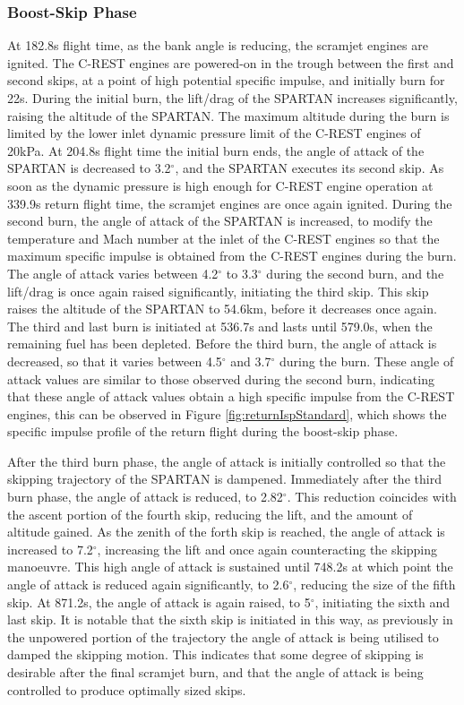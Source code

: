 \subsubsection{ Boost-Skip Phase}
At 182.8s flight time, as the bank angle is reducing, the scramjet engines are ignited. The C-REST engines are powered-on in the trough between the first and second skips, at a point of high potential specific impulse, and initially burn for 22s. During the initial burn, the lift/drag of the SPARTAN increases significantly, raising the altitude of the SPARTAN. The maximum altitude during the burn is limited by the lower inlet dynamic pressure limit of the C-REST engines of 20kPa. 
At 204.8s flight time the initial burn ends, the angle of attack of the SPARTAN is decreased to 3.2$^\circ$, and the SPARTAN executes its second skip. As soon as the dynamic pressure is high enough for C-REST engine operation at 339.9s return flight time, the scramjet engines are once again ignited.
During the second burn, the angle of attack of the SPARTAN is increased, to modify the temperature and Mach number at the inlet of the C-REST engines so that the maximum specific impulse is obtained from the C-REST engines during the burn. 
The angle of attack varies between 4.2$^\circ$ to 3.3$^\circ$ during the second burn, and the lift/drag is once again raised significantly, initiating the third skip. 
This skip raises the altitude of the SPARTAN to 54.6km, before it decreases once again. 
The third and last burn is initiated at 536.7s and lasts until 579.0s, when the remaining fuel has been depleted. Before the third burn, the angle of attack is decreased, so that it varies between 4.5$^\circ$ and 3.7$^\circ$ during the burn. These angle of attack values are similar to those observed during the second burn, indicating that these angle of attack values obtain a high specific impulse from the C-REST engines, this can be observed in Figure \ref{fig:returnIspStandard}, which shows the specific impulse profile of the return flight during the boost-skip phase. 

After the third burn phase, the angle of attack is initially controlled so that the skipping trajectory of the SPARTAN is dampened.
Immediately after the third burn phase, the angle of attack is reduced, to 2.82$^\circ$. This reduction coincides with the ascent portion of the fourth skip, reducing the lift, and the amount of altitude gained. 
As the zenith of the forth skip is reached, the angle of attack is increased to 7.2$^\circ$, increasing the lift and once again counteracting the skipping manoeuvre. 
This high angle of attack is sustained until 748.2s at which point the angle of attack is reduced again significantly, to 2.6$^\circ$, reducing the size of the fifth skip. At 871.2s, the angle of attack is again raised, to 5$^\circ$, initiating the sixth and last skip.
It is notable that the sixth skip is initiated in this way, as previously in the unpowered portion of the trajectory the angle of attack is being utilised to damped the skipping motion. This indicates that some degree of skipping is desirable after the final scramjet burn, and that the angle of attack is being controlled to produce optimally sized skips. 

